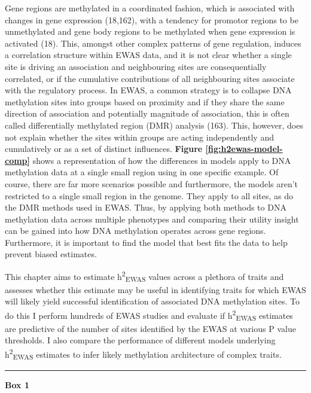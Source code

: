 \documentclass[11pt,oneside]{bristolthesis}
\begin{document}
Gene regions are methylated in a coordinated fashion, which is associated with changes in gene expression (18,162), with a tendency for promotor regions to be unmethylated and gene body regions to be methylated when gene expression is activated (18). This, amongst other complex patterns of gene regulation, induces a correlation structure within EWAS data, and it is not clear whether a single site is driving an association and neighbouring sites are consequentially correlated, or if the cumulative contributions of all neighbouring sites associate with the regulatory process. In EWAS, a common strategy is to collapse DNA methylation sites into groups based on proximity and if they share the same direction of association and potentially magnitude of association, this is often called differentially methylated region (DMR) analysis (163). This, however, does not explain whether the sites within groups are acting independently and cumulatively or as a set of distinct influences. \textbf{Figure \ref{fig:h2ewas-model-comp}} shows a representation of how the differences in models apply to DNA methylation data at a single small region using in one specific example. Of course, there are far more scenarios possible and furthermore, the models aren't restricted to a single small region in the genome. They apply to all sites, as do the DMR methods used in EWAS. Thus, by applying both methods to DNA methylation data across multiple phenotypes and comparing their utility insight can be gained into how DNA methylation operates across gene regions. Furthermore, it is important to find the model that best fits the data to help prevent biased estimates.

This chapter aims to estimate h\textsuperscript{2}\textsubscript{EWAS} values across a plethora of traits and assesses whether this estimate may be useful in identifying traits for which EWAS will likely yield successful identification of associated DNA methylation sites. To do this I perform hundreds of EWAS studies and evaluate if h\textsuperscript{2}\textsubscript{EWAS} estimates are predictive of the number of sites identified by the EWAS at various P value thresholds. I also compare the performance of different models underlying h\textsuperscript{2}\textsubscript{EWAS} estimates to infer likely methylation architecture of complex traits.
\begin{center}\rule{0.5\linewidth}{0.5pt}\end{center}

\textbf{Box 1}
\end{document}
